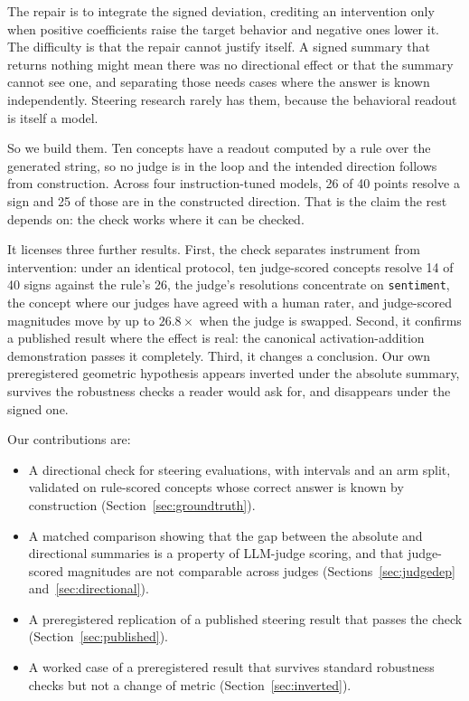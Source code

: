 \documentclass{article}
\begin{document}
The repair is to integrate the signed deviation, crediting an intervention only
when positive coefficients raise the target behavior and negative ones lower it.
The difficulty is that the repair cannot justify itself. A signed summary that
returns nothing might mean there was no directional effect or that the summary
cannot see one, and separating those needs cases where the answer is known
independently. Steering research rarely has them, because the behavioral readout
is itself a model.

So we build them. Ten concepts have a readout computed by a rule over the
generated string, so no judge is in the loop and the intended direction follows
from construction. Across four instruction-tuned models, 26 of 40 points resolve
a sign and 25 of those are in the constructed direction. That is the claim the
rest depends on: the check works where it can be checked.

It licenses three further results. First, the check separates instrument from
intervention: under an identical protocol, ten judge-scored concepts resolve 14
of 40 signs against the rule's 26, the judge's resolutions concentrate on
\texttt{sentiment}, the concept where our judges have agreed with a human rater,
and judge-scored magnitudes
move by up to $26.8\times$ when the judge is swapped. Second, it confirms a
published result where the effect is real: the canonical activation-addition
demonstration passes it completely. Third, it changes a conclusion. Our own
preregistered geometric hypothesis appears inverted under the absolute summary,
survives the robustness checks a reader would ask for, and disappears under the
signed one.

Our contributions are:
\begin{itemize}
  \item A directional check for steering evaluations, with intervals and an arm
  split, validated on rule-scored concepts whose correct answer is known by
  construction (Section~\ref{sec:groundtruth}).
  \item A matched comparison showing that the gap between the absolute and
  directional summaries is a property of LLM-judge scoring, and that
  judge-scored magnitudes are not comparable across judges
  (Sections~\ref{sec:judgedep} and~\ref{sec:directional}).
  \item A preregistered replication of a published steering result that passes
  the check (Section~\ref{sec:published}).
  \item A worked case of a preregistered result that survives standard
  robustness checks but not a change of metric (Section~\ref{sec:inverted}).
\end{itemize}
\end{document}
